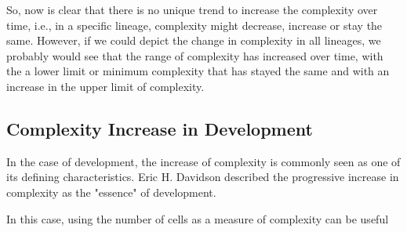 So, now is clear that there is no unique trend to increase the complexity over time, i.e., in a specific lineage, complexity might decrease, increase or stay the same.
However, if we could depict the change in complexity in all lineages, we probably would see that the range of complexity has increased over time, with the a lower limit or minimum complexity that has stayed the same and with an increase in the upper limit of complexity\citep{Arthur2010}.

\subsection{Complexity Increase in Development}

In the case of development, the increase of complexity is commonly seen as one of its defining characteristics. Eric H. Davidson described the progressive increase in complexity as the "essence" of development\citep{Davidson2001}.

In this case, using the number of cells as a measure of complexity can be useful


